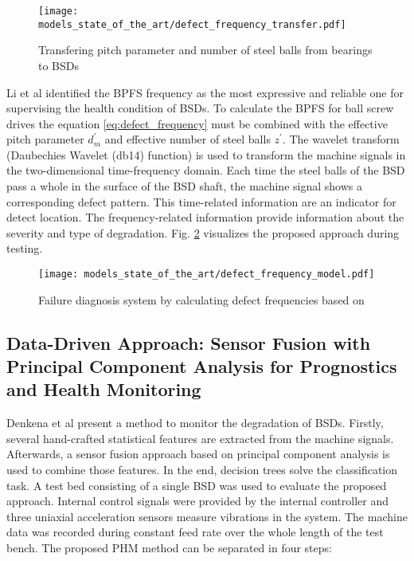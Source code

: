 \begin{figure}[H]
  \centering
  \texttt{[image: models\_state\_of\_the\_art/defect\_frequency\_transfer.pdf]}
  \caption{Transfering pitch parameter and number of steel balls from bearings to BSDs \cite{Lee2015}}
  \label{fig:defect_frequency_transfer}
\end{figure}

Li et al identified the BPFS frequency as the most expressive and reliable one for supervising the health condition of BSDs. To calculate the BPFS for ball screw drives the equation \ref{eq:defect_frequency} must be combined with the effective pitch parameter $d_{m}^{'}$ and effective number of steel balls $z^{'}$. The wavelet transform (Daubechies Wavelet (db14) function) is used to transform the machine signals in the two-dimensional time-frequency domain. Each time the steel balls of the BSD pass a whole in the surface of the BSD shaft, the machine signal shows a corresponding defect pattern. This time-related information are an indicator for detect location. The frequency-related information provide information about the severity and type of degradation. Fig. \ref{fig:defect_frequency_model} visualizes the proposed approach during testing.

\begin{figure}[H]
  \centering
  \texttt{[image: models\_state\_of\_the\_art/defect\_frequency\_model.pdf]}
  \caption{Failure diagnosis system by calculating defect frequencies based on \cite{Lee2015}}
  \label{fig:defect_frequency_model}
\end{figure}

\subsection{Data-Driven Approach: Sensor Fusion with Principal Component Analysis for Prognostics and Health Monitoring }

Denkena et al \cite{Denkena2021} present a method to monitor the degradation of BSDs. Firstly, several hand-crafted statistical features are extracted from the machine signals. Afterwards, a sensor fusion approach based on principal component analysis is used to combine those features. In the end, decision trees solve the classification task. A test bed consisting of a single BSD was used to evaluate the proposed approach. Internal control signals were provided by the internal controller and three uniaxial acceleration sensors measure vibrations in the system. The machine data was recorded during constant feed rate over the whole length of the test bench. The proposed PHM method can be separated in four steps:

